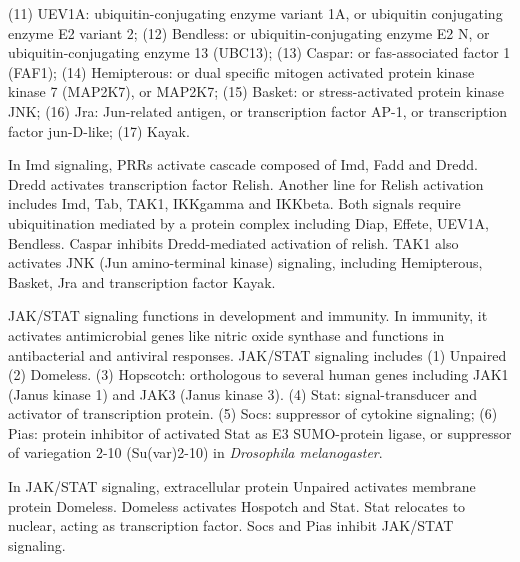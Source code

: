 \documentclass[11pt]{article}
\begin{document}
\begin{sloppypar}
(11) UEV1A: ubiquitin-conjugating enzyme variant 1A, or ubiquitin conjugating enzyme E2 variant 2; \newline
(12) Bendless: or ubiquitin-conjugating enzyme E2 N, or ubiquitin-conjugating enzyme 13 (UBC13); \newline
(13) Caspar: or fas-associated factor 1 (FAF1); \newline
(14) Hemipterous: or dual specific mitogen activated protein kinase kinase 7 (MAP2K7), or MAP2K7; \newline
(15) Basket: or stress-activated protein kinase JNK; \newline
(16) Jra: Jun-related antigen, or transcription factor AP-1, or transcription factor jun-D-like; \newline
(17) Kayak. 
\par
In Imd signaling, PRRs activate cascade composed of Imd, Fadd and Dredd. 
Dredd activates transcription factor Relish. 
Another line for Relish activation includes Imd, Tab, TAK1, IKKgamma and IKKbeta. 
Both signals require ubiquitination mediated by a protein complex including Diap, Effete, UEV1A, Bendless. 
Caspar inhibits Dredd-mediated activation of relish. 
TAK1 also activates JNK (Jun amino-terminal kinase) signaling, including Hemipterous, Basket, Jra and transcription factor Kayak. 
\par
JAK/STAT signaling functions in development and immunity. 
In immunity, it activates antimicrobial genes like nitric oxide synthase and functions in antibacterial and antiviral responses. 
JAK/STAT signaling includes 
\newline
(1) Unpaired \newline
(2) Domeless. \newline
(3) Hopscotch: orthologous to several human genes including JAK1 (Janus kinase 1) and JAK3 (Janus kinase 3). \newline
(4) Stat: signal-transducer and activator of transcription protein. \newline
(5) Socs: suppressor of cytokine signaling; \newline
(6) Pias: protein inhibitor of activated Stat as E3 SUMO-protein ligase, or suppressor of variegation 2-10 (Su(var)2-10) in \textit{Drosophila melanogaster}. 
\par
In JAK/STAT signaling, extracellular protein Unpaired activates membrane protein Domeless. 
Domeless activates Hospotch and Stat. 
Stat relocates to nuclear, acting as transcription factor. 
Socs and Pias inhibit JAK/STAT signaling. 
\par

\end{sloppypar}
\end{document}
